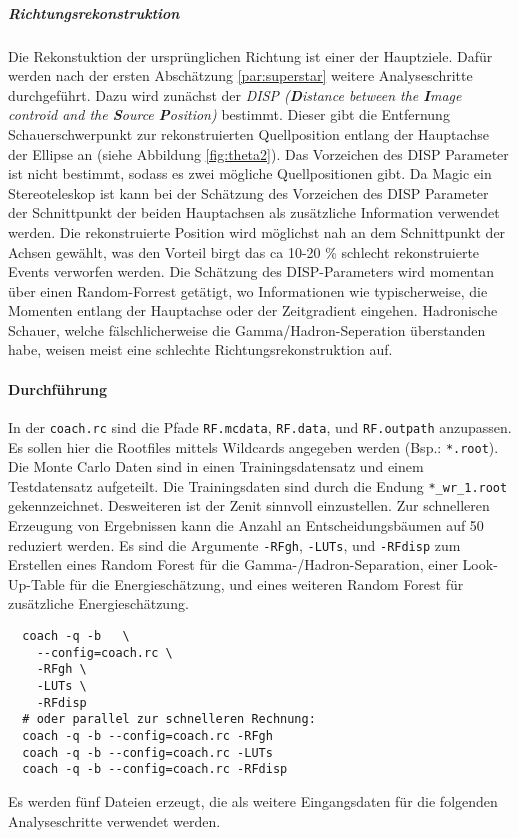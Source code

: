 \subparagraph{Richtungsrekonstruktion}%
\label{par:position}
Die Rekonstuktion der ursprünglichen Richtung ist einer der Hauptziele.
Dafür werden nach der ersten Abschätzung \ref{par:superstar} weitere 
Analyseschritte durchgeführt.
Dazu wird zunächst der \textit{DISP (\textbf{D}istance between the 
\textbf{I}mage controid and the \textbf{S}ource \textbf{P}osition)} bestimmt.
Dieser gibt die Entfernung Schauerschwerpunkt zur rekonstruierten Quellposition
entlang der Hauptachse der Ellipse an (siehe Abbildung \ref{fig:theta2}).
Das Vorzeichen des DISP Parameter ist nicht bestimmt, sodass es zwei mögliche
Quellpositionen gibt.
Da Magic ein Stereoteleskop ist kann bei der Schätzung des Vorzeichen des DISP
Parameter der Schnittpunkt der beiden Hauptachsen als zusätzliche Information
verwendet werden. 
Die rekonstruierte Position wird möglichst nah an dem Schnittpunkt der Achsen
gewählt, was den Vorteil birgt das ca 10-20 \% schlecht rekonstruierte Events
verworfen werden. 
Die Schätzung des DISP-Parameters wird momentan über einen Random-Forrest
getätigt, wo Informationen wie typischerweise, die Momenten entlang der 
Hauptachse oder der Zeitgradient eingehen.
Hadronische Schauer, welche fälschlicherweise die Gamma/Hadron-Seperation
überstanden habe, weisen meist eine schlechte Richtungsrekonstruktion auf. 

\paragraph{Durchführung}%
In der \texttt{coach.rc} sind die Pfade
\texttt{RF.mcdata},
\texttt{RF.data},
und \texttt{RF.outpath}
anzupassen.
Es sollen hier die Rootfiles mittels Wildcards angegeben werden
(Bsp.: \texttt{*.root}).
Die Monte Carlo Daten sind in einen Trainingsdatensatz
und einem Testdatensatz aufgeteilt.
Die Trainingsdaten sind durch die Endung
\texttt{*\_wr\_1.root} gekennzeichnet.
Desweiteren ist der Zenit sinnvoll einzustellen.
Zur schnelleren Erzeugung von Ergebnissen kann die Anzahl an
Entscheidungsbäumen auf \num{50}
reduziert werden.
Es sind die Argumente
\texttt{-RFgh}, \texttt{-LUTs}, und \texttt{-RFdisp}
zum Erstellen eines Random Forest für die Gamma-/Hadron-Separation,
einer Look-Up-Table für die Energieschätzung,
und eines weiteren Random Forest für zusätzliche Energieschätzung.

\begin{lstlisting}
  coach -q -b	\
    --config=coach.rc \
    -RFgh \
    -LUTs \
    -RFdisp
  # oder parallel zur schnelleren Rechnung:
  coach -q -b --config=coach.rc -RFgh
  coach -q -b --config=coach.rc -LUTs
  coach -q -b --config=coach.rc -RFdisp
\end{lstlisting}

Es werden fünf Dateien erzeugt,
die als weitere Eingangsdaten für die folgenden Analyseschritte verwendet
werden.
